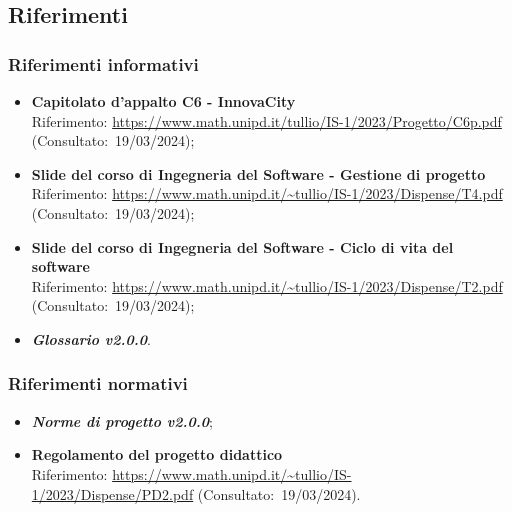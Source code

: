 \subsection{Riferimenti}
\subsubsection{Riferimenti informativi}
    \begin{itemize}
        \item \textbf{Capitolato d'appalto C6 - InnovaCity} \\
        Riferimento: \url{https://www.math.unipd.it/tullio/IS-1/2023/Progetto/C6p.pdf} (Consultato:~19/03/2024);
        \item \textbf{Slide del corso di Ingegneria del Software - Gestione di progetto} \\
        Riferimento: \url{https://www.math.unipd.it/~tullio/IS-1/2023/Dispense/T4.pdf} (Consultato:~19/03/2024); 
        \item \textbf{Slide del corso di Ingegneria del Software - Ciclo di vita del software} \\
        Riferimento: \url{https://www.math.unipd.it/~tullio/IS-1/2023/Dispense/T2.pdf} (Consultato:~19/03/2024);
        \item \textbf{\textit{Glossario v2.0.0}}.
    \end{itemize}
 
\subsubsection{Riferimenti normativi}
    \begin{itemize}
    \item \textbf{\textit{Norme di progetto v2.0.0}};
    \item \textbf{Regolamento del progetto didattico} \\
    Riferimento: \url{https://www.math.unipd.it/~tullio/IS-1/2023/Dispense/PD2.pdf} (Consultato:~19/03/2024).
    \end{itemize}